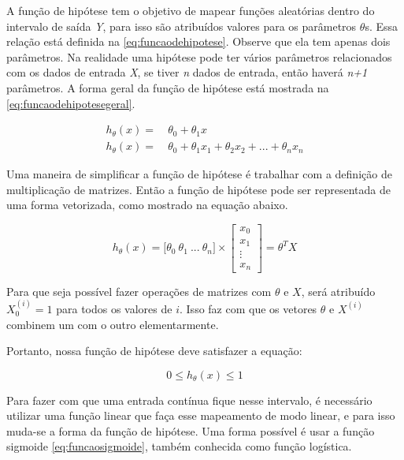 A função de hipótese tem o objetivo de mapear funções aleatórias dentro do intervalo de saída \textit{Y}, para isso são atribuídos valores para os parâmetros $\theta$s. Essa relação está definida na \autoref{eq:funcaodehipotese}. Observe que ela tem apenas dois parâmetros. Na realidade uma hipótese pode ter vários parâmetros relacionados com os dados de entrada \textit{X}, se tiver \textit{n} dados de entrada, então haverá \textit{n+1} parâmetros. A forma geral da função de hipótese está mostrada na \autoref{eq:funcaodehipotesegeral}.

\begin{align}
h_{\theta}(x) = &\ \theta_0 + \theta_1 x \label{eq:funcaodehipotese} \\
h_{\theta}(x) = &\ \theta_0 + \theta_1 x_1 + \theta_2 x_2 + ... + \theta_n x_n \label{eq:funcaodehipotesegeral}
\end{align}

Uma maneira de simplificar a função de hipótese é trabalhar com a definição de multiplicação de matrizes. Então a função de hipótese pode ser representada de uma forma vetorizada, como mostrado na equação abaixo. 

\begin{equation}
h_{\theta}(x) = \big[\theta_0\ \theta_1\ ...\ \theta_n\big] \times \begin{bmatrix} x_0 \\ x_1 \\ \vdots \\ x_n \end{bmatrix}  = \theta^TX \nonumber
\end{equation}

Para que seja possível fazer operações de matrizes com $\theta$ e $X$, será atribuído $X_0^{(i)} = 1$ para todos os valores de $i$. Isso faz com que os vetores $\theta$ e $X^{(i)}$ combinem um com o outro elementarmente.

Portanto, nossa função de hipótese deve satisfazer a equação:

\begin{equation}
0 \leq h_{\theta}(x) \leq 1 \nonumber
\end{equation}

Para fazer com que uma entrada contínua fique nesse intervalo, é necessário utilizar uma função linear que faça esse mapeamento de modo linear, e para isso muda-se a forma da função de hipótese. Uma forma possível é usar a função sigmoide \autoref{eq:funcaosigmoide}, também conhecida como função logística.

